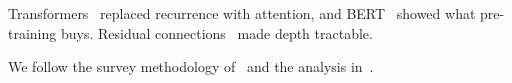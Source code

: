 \documentclass{article}
\begin{document}
Transformers~\cite{vaswani2017attention} replaced recurrence with
attention, and BERT~\cite{devlin2019bert} showed what pre-training
buys. Residual connections~\cite{he2016resnet} made depth tractable.

We follow the survey methodology of~\cite{smith2020data} and the
analysis in~\parencite{jones2024missing}.
\end{document}
